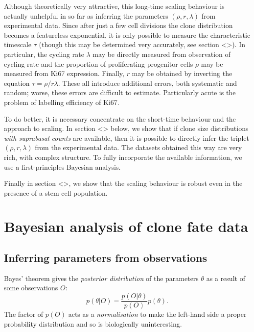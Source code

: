 \documentclass[10pt,UKenglish]{article}
\begin{document}
Although theoretically very attractive, this long-time scaling behaviour is actually unhelpful in so far as inferring the parameters $(\rho, r, \lambda)$ from experimental data. Since after just a few cell divisions the clone distribution becomes a featureless exponential, it is only possible to measure the characteristic timescale $\tau$ (though this may be determined very accurately, see section <>). In particular, the cycling rate $\lambda$ may be directly measured from observation of cycling rate and the proportion of proliferating progenitor cells $\rho$ may be measured from Ki67 expression. Finally, $r$ may be obtained by inverting the equation $\tau = \rho/r\lambda$. These all introduce additional errors, both systematic and random; worse, these errors are difficult to estimate. Particularly acute is the problem of labelling efficiency of Ki67.

To do better, it is necessary concentrate on the short-time behaviour and the approach to scaling. In section <> below, we show that if clone size distributions \emph{with suprabasal counts} are available, then it is possible to directly infer the triplet $(\rho, r, \lambda)$ from the experimental data. The datasets obtained this way are very rich, with complex structure. To fully incorporate the available information, we use a first-principles Bayesian analysis.

Finally in section <>, we show that the scaling behaviour is robust even in the presence of a stem cell population.

\section{Bayesian analysis of clone fate data}


\subsection{Inferring parameters from observations}

Bayes' theorem gives the \emph{posterior distribution} of the parameters $\theta$ as a result of some observations $O$: $$p(\theta|O) = \frac{p(O|\theta)}{p(O)} p(\theta).$$ The factor of $p(O)$ acts as a \emph{normalisation} to make the left-hand side a proper probability distribution and so is biologically uninteresting. 
\end{document}
